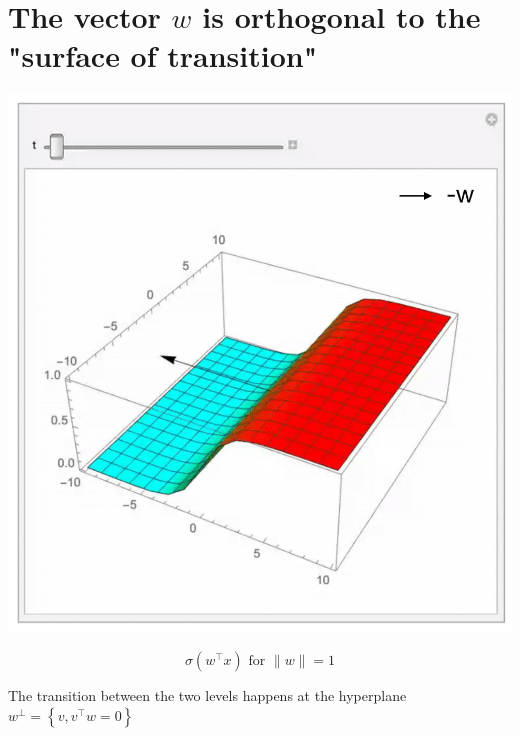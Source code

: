 \documentclass[10pt]{article}
\begin{document}
\section*{The vector $w$ is orthogonal to the "surface of transition"}
\begin{center}
\includegraphics[max width=\textwidth]{2023_12_30_261a5c67f471a6c49904g-09}
\end{center}

$$
\sigma\left(w^{\top} x\right) \text { for }\|w\|=1
$$

The transition between the two levels happens at the hyperplane $w^{\perp}=\left\{v, v^{\top} w=0\right\}$
\end{document}
